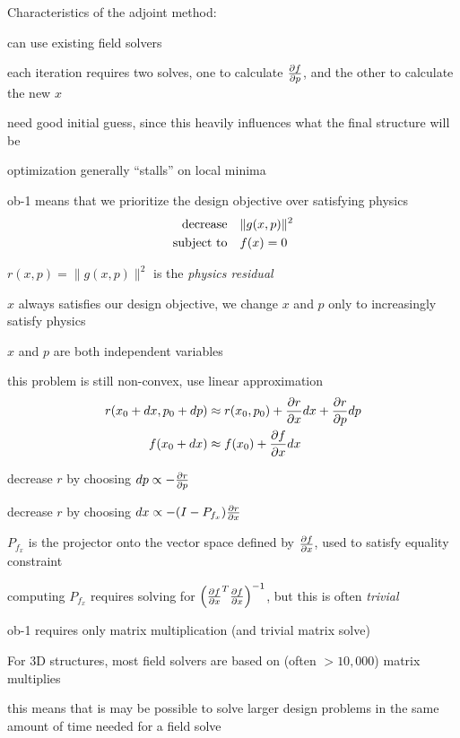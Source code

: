\documentclass[landscape]{foils}
\renewcommand{\oursection}[1]{
\foilhead[-1.0cm]{#1}
}
\begin{document}
Characteristics of the adjoint method:
\BIT
\item can use existing field solvers 
\item each iteration requires two solves, one to calculate $\frac{\partial f}{\partial p}$, and the other to calculate the new $x$
\item need good initial guess, since this heavily influences what the final structure will be
\item optimization generally ``stalls'' on local minima
\EIT

\oursection{Objective-first approach}
ob-1 means that we prioritize the design objective over satisfying physics
\begin{align}
\mbox{decrease} & \quad \|g(x,p)\|^2 \\
\mbox{subject to} & \quad f(x) = 0
\end{align}
\BIT
\item $r(x,p) = \|g(x,p)\|^2$ is the \emph{physics residual}
\item $x$ always satisfies our design objective, we change $x$ and $p$ only to increasingly satisfy physics
\item $x$ and $p$ are both independent variables
\EIT
\newpage

\BIT
\item this problem is still non-convex, use linear approximation 
\begin{align}
r(x_0+dx,p_0+dp) & \approx r(x_0,p_0) + \frac{\partial r}{\partial x} dx + \frac{\partial r}{\partial p} dp \\
f(x_0+dx) & \approx f(x_0) + \frac{\partial f}{\partial x} dx 
\end{align}
\item decrease $r$ by choosing $dp \propto -\frac{\partial r}{\partial p}$
\item decrease $r$ by choosing 
    $dx \propto - (I - P_{f_x}) \frac{\partial r}{\partial x}$
\item $P_{f_x}$ is the projector onto the vector space defined by $\frac{\partial f}{\partial x}$, used to satisfy equality constraint
\item computing $P_{f_x}$ requires solving for $\left(\frac{\partial f}{\partial x}^T \frac{\partial f}{\partial x}\right)^{-1}$, but this is often \emph{trivial}
\EIT
\newpage


ob-1 requires only matrix multiplication (and trivial matrix solve)
\BIT
\item For 3D structures, most field solvers are based on (often $>10,000$) matrix multiplies
\item this means that is may be possible to solve larger design problems in the same amount of time needed for a field solve
\EIT
\end{document}
